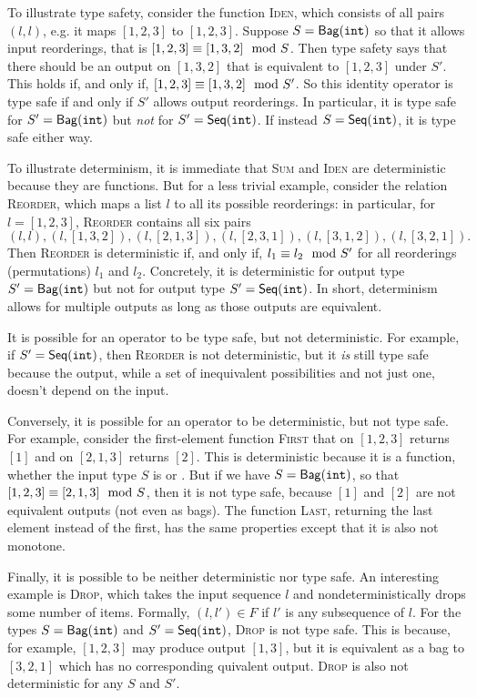 To illustrate type safety, consider the function \textsc{Iden}, which consists of all pairs $(l, l)$, e.g. it maps $[1, 2, 3]$ to $[1, 2, 3]$.
Suppose $S = \mathsf{Bag}({\texttt{int}}){}$ so that it allows input reorderings, that is $[1, 2, 3] \equiv [1, 3, 2] \mod {S}$.
Then type safety says that there should be an output on $[1, 3, 2]$ that is equivalent to $[1, 2, 3]$ under $S'$.
This holds if, and only if, $[1, 2, 3] \equiv [1, 3, 2] \mod {S'}$.
So this identity operator is type safe if and only if $S'$ allows output reorderings.
In particular, it is type safe for $S' = \mathsf{Bag}({\texttt{int}}){}$ but \emph{not} for $S' = \mathsf{Seq}({\texttt{int}}){}$.
If instead $S = \mathsf{Seq}({\texttt{int}}){}$, it is type safe either way.

To illustrate determinism, it is immediate that \textsc{Sum} and \textsc{Iden} are deterministic because they are functions. But for a less trivial example, consider the relation \textsc{Reorder}, which maps a list $l$ to all its possible reorderings: in particular, for $l = [1, 2, 3]$, \textsc{Reorder} contains all six pairs
\[
(l, l), (l, [1, 3, 2]), (l, [2, 1, 3]), (l, [2, 3, 1]), (l, [3, 1, 2]), (l, [3, 2, 1]).
\]
Then \textsc{Reorder} is deterministic if, and only if, $l_1 \equiv l_2 \mod {S'}$ for all reorderings (permutations) $l_1$ and $l_2$.
Concretely, it is deterministic for output type $S' = \mathsf{Bag}({\texttt{int}}){}$ but not for output type $S' = \mathsf{Seq}({\texttt{int}}){}$.
In short, determinism allows for multiple outputs as long as those outputs are equivalent.

It is possible for an operator to be type safe, but not deterministic. For example, if $S' = \mathsf{Seq}({\texttt{int}}){}$, then \textsc{Reorder} is not deterministic, but it \emph{is} still type safe because the output, while a set of inequivalent possibilities and not just one, doesn't depend on the input.

Conversely, it is possible for an operator to be deterministic, but not type safe.
For example, consider the first-element function \textsc{First} that on $[1, 2, 3]$ returns $[1]$ and on $[2, 1, 3]$ returns $[2]$. This is deterministic because it is a function, whether the input type $S$ is \seqint{} or \relint{}. But if we have $S = \mathsf{Bag}({\texttt{int}}){}$, so that $[1, 2, 3] \equiv [2, 1, 3] \mod {S}$, then it is not type safe, because $[1]$ and $[2]$ are not equivalent outputs (not even as bags).
The function \textsc{Last}, returning the last element instead of the first, has the same properties except that it is also not monotone.

Finally, it is possible to be neither deterministic nor type safe.
An interesting example is \textsc{Drop}, which takes the input sequence $l$ and nondeterministically drops some number of items. Formally, $(l, l') \in F$ if $l'$ is any subsequence of $l$. For the types $S = \mathsf{Bag}({\texttt{int}}){}$ and $S' = \mathsf{Seq}({\texttt{int}}){}$, \textsc{Drop} is not type safe.
This is because, for example, $[1, 2, 3]$ may produce output $[1, 3]$, but it is equivalent as a bag to $[3, 2, 1]$ which has no corresponding quivalent output.
\textsc{Drop} is also not deterministic for any $S$ and $S'$.

